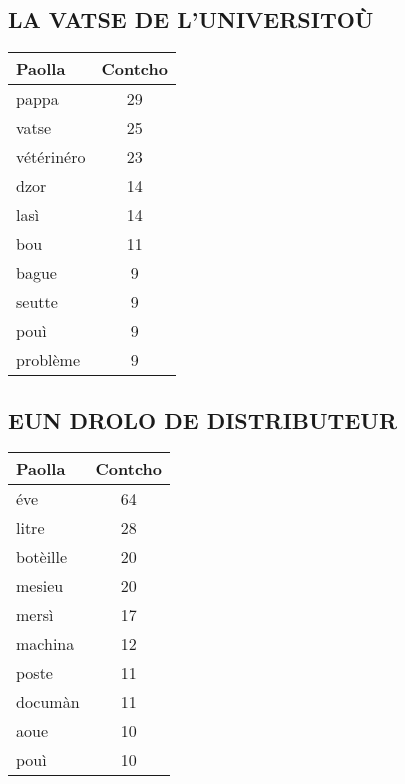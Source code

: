 \vspace{1em}
\begin{minipage}{0.48\textwidth}
\subsection*{LA VATSE DE L’UNIVERSITO\`U}
\begin{tabular}{lc}
\toprule
\textbf{Paolla} & \textbf{Contcho} \\
\midrule
pappa & 29 \\
vatse & 25 \\
vétérinéro & 23 \\
dzor & 14 \\
lasì & 14 \\
bou & 11 \\
bague & 9 \\
seutte & 9 \\
pouì & 9 \\
problème & 9 \\
\bottomrule
\end{tabular}
\end{minipage}
\hfill
\begin{minipage}{0.48\textwidth}
\subsection*{EUN DROLO DE DISTRIBUTEUR}
\begin{tabular}{lc}
\toprule
\textbf{Paolla} & \textbf{Contcho} \\
\midrule
éve & 64 \\
litre & 28 \\
botèille & 20 \\
mesieu & 20 \\
mersì & 17 \\
machina & 12 \\
poste & 11 \\
documàn & 11 \\
aoue & 10 \\
pouì & 10 \\
\bottomrule
\end{tabular}
\end{minipage}

